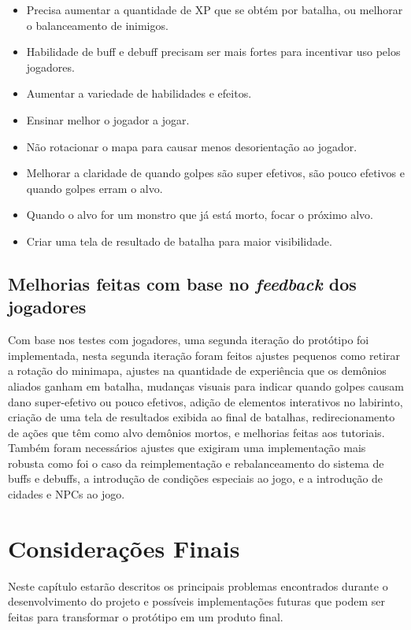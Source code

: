 \begin{itemize}
\item Precisa aumentar a quantidade de XP que se obtém por batalha, ou melhorar o balanceamento de inimigos.
\item Habilidade de buff e debuff precisam ser mais fortes para incentivar uso pelos jogadores.
\item Aumentar a variedade de habilidades e efeitos.
\item Ensinar melhor o jogador a jogar.
\item Não rotacionar o mapa para causar menos desorientação ao jogador.
\item Melhorar a claridade de quando golpes são super efetivos, são pouco efetivos e quando golpes erram o alvo.
\item Quando o alvo for um monstro que já está morto, focar o próximo alvo.
\item Criar uma tela de resultado de batalha para maior visibilidade.
\end{itemize}

\section{Melhorias feitas com base no \emph{feedback} dos jogadores}

	Com base nos testes com jogadores, uma segunda iteração do protótipo foi implementada, nesta segunda iteração foram feitos ajustes pequenos como retirar a rotação do minimapa, ajustes na quantidade de experiência que os demônios aliados ganham em batalha, mudanças visuais para indicar quando golpes causam dano super-efetivo ou pouco efetivos, adição de elementos interativos no labirinto, criação de uma tela de resultados exibida ao final de batalhas, redirecionamento de ações que têm como alvo demônios mortos, e melhorias feitas aos tutoriais. Também foram necessários ajustes que exigiram uma implementação mais robusta como foi o caso da reimplementação e rebalanceamento do sistema de buffs e debuffs, a introdução de condições especiais ao jogo, e a introdução de cidades e NPCs ao jogo.

\chapter{Considerações Finais}

Neste capítulo estarão descritos os principais problemas encontrados durante o desenvolvimento do projeto e possíveis implementações futuras que podem ser feitas para transformar o protótipo em um produto final.

